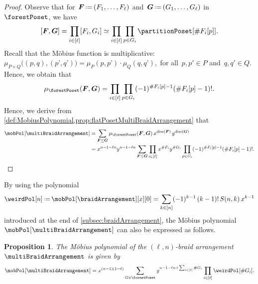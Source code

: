 \documentclass{amsart}
\newtheorem{proposition}[theorem]{Proposition}
\theoremstyle{definition}
\renewcommand{\b}[1]{{\boldsymbol{#1}}} %
\newcommand{\eqdef}{\mbox{\,\raisebox{0.2ex}{\scriptsize\ensuremath{\mathrm:}}\ensuremath{=}\,}} %
\newcommand{\card}[1]{\##1} %
\renewcommand{\b}[1]{\boldsymbol{#1}} %
\begin{document}
\begin{proof}
Observe that for~$\b{F} \eqdef (F_1, \dots, F_\ell)$ and~$\b{G} \eqdef (G_1, \dots, G_\ell)$ in~$\forestPoset$, we have
\[
[\b{F}, \b{G}] = \prod_{i \in [\ell]} [F_i, G_i] \simeq \prod_{i \in [\ell]} \prod_{p \in G_i} \partitionPoset[{\card{F_i[p]}}].
\]
Recall that the M\"obius function is multiplicative:
\(
\mu_{P \times Q} \big( (p,q), (p’,q’) \big) = \mu_P(p,p’) \cdot \mu_Q(q,q’),
\)
for all~$p, p' \in P$ and~$q, q' \in Q$.
Hence, we obtain that
\[
\mu_{\forestPoset}(\b{F}, \b{G}) = \prod_{i \in [\ell]} \prod_{p \in G_i} (-1)^{\card{F_i[p]}-1} (\card{F_i[p]}-1)! .
\]
Hence, we derive from \cref{def:MobiusPolynomial,prop:flatPosetMultiBraidArrangement} that
\begin{align*}
\mobPol[\multiBraidArrangement] 
& = \sum_{\b{F} \le \b{G}} \mu_{\forestPoset}(\b{F}, \b{G}) \, x^{\dim(\b{F})} \, y^{\dim(\b{G})} \\
& = x^{n-1-\ell n} y^{n-1-\ell n} \sum_{\b{F} \le \b{G}} \prod_{i \in [\ell]} x^{\card{F_i}} y^{\card{G_i}} \prod_{p \in G_i} (-1)^{\card{F_i[p]}-1} (\card{F_i[p]}-1)! .
\qedhere
\end{align*}
\end{proof}

By using the polynomial
\[
\weirdPol[n] \eqdef \mobPol[\braidArrangement][x][0] = \sum_{k \in [n]} (-1)^{k-1} \, (k-1)! \, S(n,k) \, x^{k-1}
\]
introduced at the end of \cref{subsec:braidArrangement}, the M\"obius polynomial~$\mobPol[\multiBraidArrangement]$ can also be expressed as follows.

\pagebreak
\begin{proposition} 
\label{prop:alternativeFormulaMobiusPolynomialMultiBraidArrangement}
The M\"obius polynomial of the $(\ell,n)$-braid arrangement~$\multiBraidArrangement$ is given by
\[
\mobPol[\multiBraidArrangement] = x^{(n-1)(1-\ell)} \sum_{G \in \forestPoset} y^{n-1-\ell n+\sum_{i \in [\ell]} \card{G_i}}  \prod_{i \in [\ell]} \weirdPol[\card{G_i}].
\]
\end{proposition}
\end{document}
